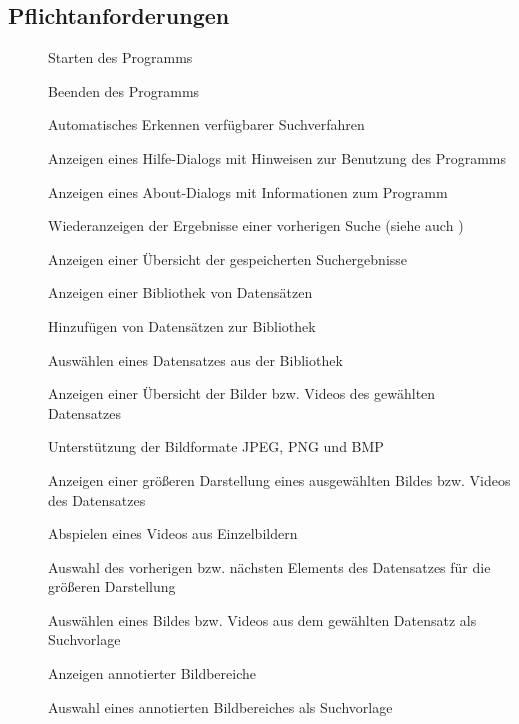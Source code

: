 \subsection{Pflichtanforderungen}
\begin{description}
	\item[] Starten des Programms
	\item[] Beenden des Programms
	\item[] Automatisches Erkennen verfügbarer Suchverfahren
	\item[] Anzeigen eines Hilfe-Dialogs mit Hinweisen zur Benutzung des Programms
	\item[] Anzeigen eines About-Dialogs mit Informationen zum Programm
	\newline
	\item[] Wiederanzeigen der Ergebnisse einer vorherigen Suche (siehe auch )
	\item[] Anzeigen einer Übersicht der gespeicherten Suchergebnisse
	\item[] Anzeigen einer Bibliothek von Datensätzen
	\item[] Hinzufügen von Datensätzen zur Bibliothek
	\item[] Ausw\"ahlen eines Datensatzes aus der Bibliothek
	\item[] Anzeigen einer Übersicht der Bilder bzw. Videos des gewählten Datensatzes
	\item[] Unterstützung der Bildformate JPEG, PNG und BMP
	\item[] Anzeigen einer größeren Darstellung eines ausgewählten Bildes bzw. Videos des Datensatzes
	\item[] Abspielen eines Videos aus Einzelbildern
	\item[] Auswahl des vorherigen bzw. nächsten Elements des Datensatzes für die größeren Darstellung
	\item[] Ausw\"ahlen eines Bildes bzw. Videos aus dem gewählten Datensatz als Suchvorlage
	\item[] Anzeigen annotierter Bildbereiche
	\item[] Auswahl eines annotierten Bildbereiches als Suchvorlage

\end{description}
